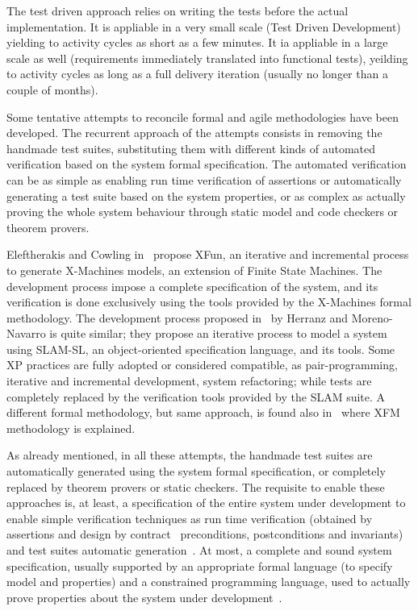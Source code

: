 \documentclass[english]{lni}
\begin{document}
The test driven approach relies on writing the tests before the actual implementation. 
It is appliable in a very small scale (Test Driven Development) yielding to activity cycles as short as a few minutes.
It ia appliable in a large scale as well (requirements immediately translated into functional tests), yeilding to activity cycles as long as a full delivery iteration (usually no longer than a couple of months).

Some tentative attempts to reconcile formal and agile methodologies have been developed.
The recurrent approach of the attempts consists in removing the handmade test suites, substituting them with different kinds of automated verification based on the system formal specification. 
The automated verification can be as simple as enabling run time verification of assertions or automatically generating a test suite based on the system properties, or as complex as actually proving the whole system behaviour through static model and code checkers or theorem provers.

Eleftherakis and Cowling in~\cite{Eleftherakis2003} propose XFun, an iterative and incremental process to generate X-Machines models, an extension of Finite State Machines. 
The development process impose a complete specification of the system, and its verification is done exclusively using the tools provided by the X-Machines formal methodology. 
The development process proposed in~\cite{Herranz2003b} by Herranz and Moreno-Navarro is quite similar; they propose an iterative process to model a system using SLAM-SL, an object-oriented specification language, and its tools. 
Some XP practices are fully adopted or considered compatible, as pair-programming, iterative and incremental development, system refactoring; while tests are completely replaced by the verification tools provided by the SLAM suite.
A different formal methodology, but same approach, is found also in~\cite{Suhaib2005} where XFM methodology is explained.

As already mentioned, in all these attempts, the handmade test suites are automatically generated using the system formal specification, or completely replaced by theorem provers or static checkers. 
The requisite to enable these approaches is, at least, a specification of the entire system under development to enable simple verification techniques as run time verification (obtained by assertions and design by contract~\cite{Meyer1997} preconditions, postconditions and invariants) and test suites automatic generation~\cite{Cheon2002,Cheon2004,Cheon2005}.
At most, a complete and sound system specification, usually supported by an appropriate formal language (to specify model and properties) and a constrained programming language, used to actually prove properties about the system under development~\cite{CatanoHuisman02,DetlefsNelsonSaxe2005,KiniryCok04}.
\end{document}
